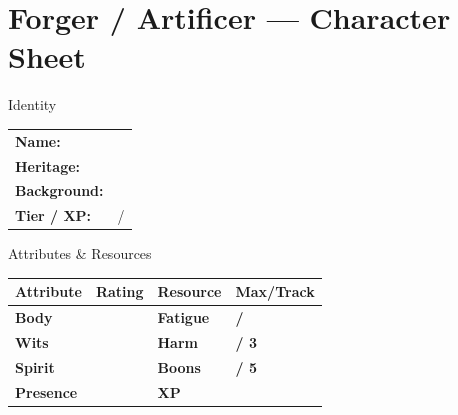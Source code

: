 \documentclass[10pt]{article}
\begin{document}
\newpage

\section*{Forger / Artificer --- Character Sheet}

\begin{minipage}[t]{0.48\linewidth}
    \begin{charbox}{Identity}
        \begin{tabular}{p{2.5cm} p{5cm}}
            \textbf{Name:} & \underline{\hspace{4cm}} \\
            \textbf{Heritage:} & \underline{\hspace{4cm}} \\
            \textbf{Background:} & \underline{\hspace{4cm}} \\
            \textbf{Tier / XP:} & \underline{\hspace{2cm}} / \underline{\hspace{2cm}} \\
        \end{tabular}
    \end{charbox}
    
    \vspace{0.5em}
    
    \begin{charbox}{Attributes \& Resources}
        \begin{tabular}{>{\bfseries}p{2.5cm} >{\bfseries}p{1.5cm} >{\bfseries}p{2.5cm} >{\bfseries}p{1.5cm}}
            \toprule
            \textbf{Attribute} & \textbf{Rating} & \textbf{Resource} & \textbf{Max/Track} \\
            \midrule
            Body & \underline{\hspace{1.5cm}} & Fatigue & \underline{\hspace{1.5cm}} / \underline{\hspace{1.5cm}} \\
            Wits & \underline{\hspace{1.5cm}} & Harm & \underline{\hspace{1.5cm}} / 3 \\
            Spirit & \underline{\hspace{1.5cm}} & Boons & \underline{\hspace{1.5cm}} / 5 \\
            Presence & \underline{\hspace{1.5cm}} & XP & \underline{\hspace{1.5cm}} \\
            \bottomrule
        \end{tabular}
    \end{charbox}
    

\end{minipage}
\end{document}
